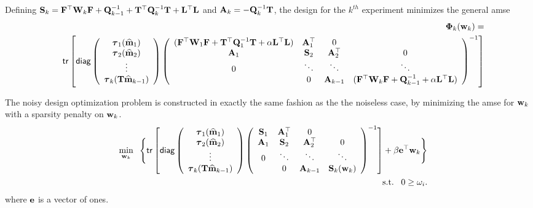 \documentclass[11pt]{article}
\newcommand{\bfA}	{{\bf{A}}}
\newcommand{\bfF}	{{\bf{F}}}
\newcommand{\bfL}	{{\bf{L}}}
\newcommand{\bfQ}	{{\bf{Q}}}
\newcommand{\bfS}	{{\bf{S}}}
\newcommand{\bfT}	{{\bf{T}}}
\newcommand{\bfW}	{{\bf{W}}}
\newcommand{\bfe}	{{\bf{e}}}
\newcommand{\bfm}	{{\bf{m}}}
\newcommand{\bfw}	{{\bf{w}}}
\newcommand{\bfPhi}     {{\boldsymbol \Phi}}
\newcommand{\bftau}      {{\boldsymbol \tau}}
\newcommand{\bfmhat}    {{\widehat{\bfm}}}
\newcommand{\LtL}       { \bfL^{\top}\bfL}
\renewcommand{\bfmhat}	{\widehat{\bf m}}
\begin{document}
{Defining $\bfS_k = \bfF^{\top}\bfW_{k}\bfF + \bfQ^{-1}_{k-1} + \bfT^{\top}\bfQ^{-1}_{k}\bfT + \LtL$  and $\bfA_k = -\bfQ^{-1}_k \bfT$, the design for the $k^{th}$ experiment minimizes  the  general {\sf amse} 
\begin{eqnarray}
\label{eq:noisyPhi}
&&\bfPhi_k(\bfw_k) =\\ 
&&{\sf tr} \left[{\sf diag}\left( \begin{array}{c}
\bftau_1(\bfmhat_1) \\ 
\bftau_2(\bfmhat_2)  \\
\vdots \\
\bftau_k(\bfT\bfmhat_{k-1})\end{array}\right)
\left(\begin{array}{cccc}
  (\bfF^{\top}\bfW_{1}\bfF  + \bfT^{\top}\bfQ^{-1}_{1}\bfT + \alpha\LtL) &  \bfA^{\top}_1 & 0 & \\
 \bfA_1 & \bfS_2 & \bfA^{\top}_2 & 0 \\
 0 & \ddots & \ddots & \ddots \\
 & 0 & \bfA_{k-1} &  (\bfF^{\top}\bfW_{k}\bfF + \bfQ^{-1}_{k-1} + \alpha\LtL) 
  \end{array}\right)^{-1}\right]
\end{eqnarray}
  
The noisy design optimization problem is constructed in exactly the same fashion as the the noiseless case, by minimizing the {\sf amse} for $\bfw_k$ with a sparsity penalty on $\bfw_k$. 
\begin{eqnarray*}
 &&\min_{\bfw_k}\;\;\Bigg \{{\sf tr} \left[{\sf diag}\left( \begin{array}{c}
\bftau_1(\bfmhat_1) \\ 
\bftau_2(\bfmhat_2)  \\
\vdots \\
\bftau_k(\bfT\bfmhat_{k-1})\end{array}\right)
\left(\begin{array}{cccc}
 \bfS_1 &  \bfA^{\top}_1 & 0 & \\
 \bfA_1 & \bfS_2 & \bfA^{\top}_2 & 0 \\
 0 & \ddots & \ddots & \ddots \\
 & 0 & \bfA_{k-1} & \bfS_k(\bfw_k)  \end{array}\right)^{-1}\right] + \beta \bfe^{\top}\bfw_k \Bigg \}\\
 &&\text{ s.t.} \;\;\;0 \geq \omega_i.
\end{eqnarray*}
where $\bfe$ is a vector of ones.

}
\end{document}
